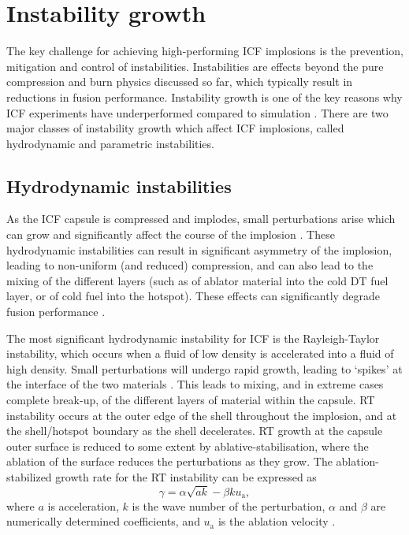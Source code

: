 \section{Instability growth}
The key challenge for achieving high-performing ICF implosions is the prevention, mitigation and control of instabilities. Instabilities are effects beyond the pure compression and burn physics discussed so far, which typically result in reductions in fusion performance. Instability growth is one of the key reasons why ICF experiments have underperformed compared to simulation \cite{Lindl2014, Hurricane2014, Smalyuk2020}. There are two major classes of instability growth which affect ICF implosions, called hydrodynamic and parametric instabilities.

\subsection{Hydrodynamic instabilities} \label{Hydro instabilities}
As the ICF capsule is compressed and implodes, small perturbations arise which can grow and significantly affect the course of the implosion \cite{Atzeni2008}. These hydrodynamic instabilities can result in significant asymmetry of the implosion, leading to non-uniform (and reduced) compression, and can also lead to the mixing of the different layers (such as of ablator material into the cold DT fuel layer, or of cold fuel into the hotspot). These effects can significantly degrade fusion performance \cite{Ma2013}.

The most significant hydrodynamic instability for ICF is the Rayleigh-Taylor instability, which occurs when a fluid of low density is accelerated into a fluid of high density. Small perturbations will undergo rapid growth, leading to `spikes' at the interface of the two materials \cite{Atzeni2008}. This leads to mixing, and in extreme cases complete break-up, of the different layers of material within the capsule. RT instability occurs at the outer edge of the shell throughout the implosion, and at the shell/hotspot boundary as the shell decelerates. RT growth at the capsule outer surface is reduced to some extent by ablative-stabilisation, where the ablation of the surface reduces the perturbations as they grow. The ablation-stabilized growth rate for the RT instability can be expressed as
\begin{equation} \gamma = \alpha \sqrt{ak} - \beta k u_\mathrm{a}, \label{eq:RTI} \end{equation}
where $a$ is acceleration, $k$ is the wave number of the perturbation, $\alpha$ and $\beta$ are numerically determined coefficients, and $u_\mathrm{a}$ is the ablation velocity \cite{Takabe1985, Betti1998}.

